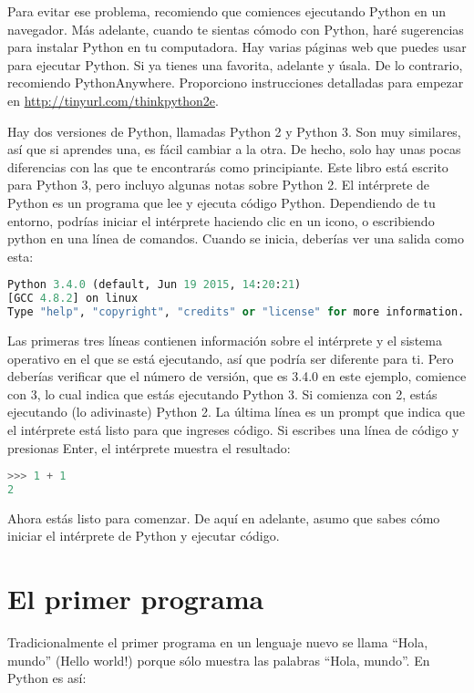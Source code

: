 \documentclass[12pt,letterpaper]{book}
\begin{document}
Para evitar ese problema, recomiendo que comiences ejecutando Python en un navegador. Más adelante, cuando te sientas cómodo con Python, haré sugerencias para instalar Python en tu computadora.
Hay varias páginas web que puedes usar para ejecutar Python. Si ya tienes una favorita, adelante y úsala. De lo contrario, recomiendo PythonAnywhere. Proporciono instrucciones detalladas para empezar en \href{http://tinyurl.com/thinkpython2e}{http://tinyurl.com/thinkpython2e}.

Hay dos versiones de Python, llamadas Python 2 y Python 3. Son muy similares, así que si aprendes una, es fácil cambiar a la otra. De hecho, solo hay unas pocas diferencias con las que te encontrarás como principiante. Este libro está escrito para Python 3, pero incluyo algunas notas sobre Python 2.
El intérprete de Python es un programa que lee y ejecuta código Python. Dependiendo de tu entorno, podrías iniciar el intérprete haciendo clic en un icono, o escribiendo python en una línea de comandos. Cuando se inicia, deberías ver una salida como esta:

\begin{lstlisting}[language=Python, basicstyle=\ttfamily]
Python 3.4.0 (default, Jun 19 2015, 14:20:21)
[GCC 4.8.2] on linux
Type "help", "copyright", "credits" or "license" for more information.
\end{lstlisting}

Las primeras tres líneas contienen información sobre el intérprete y el sistema operativo en el que se está ejecutando, así que podría ser diferente para ti. Pero deberías verificar que el número de versión, que es 3.4.0 en este ejemplo, comience con 3, lo cual indica que estás ejecutando Python 3. Si comienza con 2, estás ejecutando (lo adivinaste) Python 2.
La última línea es un prompt que indica que el intérprete está listo para que ingreses código. Si escribes una línea de código y presionas Enter, el intérprete muestra el resultado:

\begin{lstlisting}[language=Python, basicstyle=\ttfamily]
>>> 1 + 1
2
\end{lstlisting}

Ahora estás listo para comenzar. De aquí en adelante, asumo que sabes cómo iniciar el intérprete de Python y ejecutar código.

\section{El primer programa}
Tradicionalmente el primer programa en un lenguaje nuevo se llama “Hola,
mundo” (Hello world!) porque sólo muestra las palabras “Hola, mundo”.
En Python es así:
\end{document}
